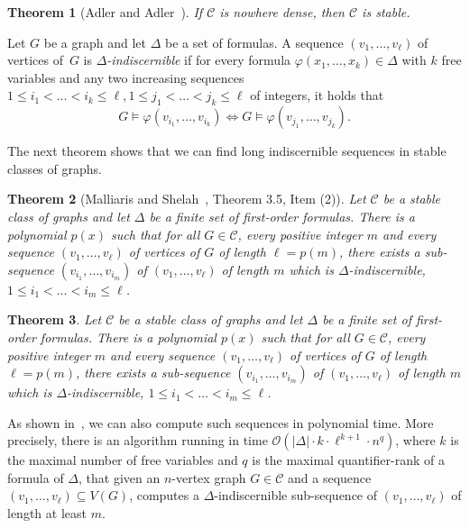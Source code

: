 \documentclass[11pt, fleqn]{article}
\theoremstyle{plain}
\newtheorem{theorem}{Theorem}
\theoremstyle{nonumberplain}
\newcommand{\Oof}{\mathcal{O}}
\newcommand{\CCC}{\mathcal{C}}
\renewcommand{\phi}{\varphi}
\newcommand{\abs}[1]{\ensuremath{\left\lvert#1\right\rvert}}
\begin{document}
\begin{theorem}[Adler and Adler~\cite{adler2014interpreting}]\label{thm:adleradler}
If $\CCC$ is nowhere dense, then $\CCC$ is stable. 
\end{theorem}

Let $G$ be a graph and let $\Delta$ be a set of formulas. A sequence
$(v_1,\ldots, v_\ell)$ of vertices of~$G$ is
\emph{$\Delta$-indiscernible} if for every formula
$\phi(x_1,\ldots, x_k)\in \Delta$ with $k$ free variables and any two
increasing sequences
$1\leq i_1<\ldots <i_k\leq \ell, 1\leq j_1< \ldots< j_k\leq \ell$ of
integers, it holds that
\[G\models\phi(v_{i_1},\ldots, v_{i_k})\Leftrightarrow G\models\phi(v_{j_1},
\ldots, v_{j_k}).\]

The next theorem shows that we can find long indiscernible
sequences in stable classes of graphs. 

\begin{theorem}[Malliaris and Shelah~\cite{malliaris2014regularity}, Theorem 3.5, Item (2)]\label{thm:malshelah}
  Let $\CCC$ be a stable class of graphs and let $\Delta$ be a finite
  set of first-order formulas.  There is a polynomial $p(x)$ such that
  for all $G\in \CCC$, every positive integer $m$ and every sequence
  $(v_1,\ldots, v_\ell)$ of vertices of $G$ of length $\ell=p(m)$, there
  exists a sub-sequence $(v_{i_1},\ldots, v_{i_m})$ of
  $(v_1,\ldots, v_\ell)$ of length $m$ which is
  $\Delta$-indiscernible, $1\leq i_1<\ldots <i_m\leq \ell$.
\end{theorem}


\begin{theorem}\label{thm:extract_indiscernibles}
  Let $\CCC$ be a stable class of graphs and let $\Delta$ be a finite
  set of first-order formulas.  There is a polynomial $p(x)$ such that
  for all $G\in \CCC$, every positive integer $m$ and every sequence
  $(v_1,\ldots, v_\ell)$ of vertices of $G$ of length $\ell=p(m)$, there
  exists a sub-sequence $(v_{i_1},\ldots, v_{i_m})$ of
  $(v_1,\ldots, v_\ell)$ of length $m$ which is
  $\Delta$-indiscernible, $1\leq i_1<\ldots <i_m\leq \ell$.
\end{theorem}

As shown in~\cite{siebertz2016polynomial}, we can also compute
such sequences in polynomial time. More precisely, there is an algorithm running in time
  $\Oof(\abs{\Delta}\cdot k \cdot \ell^{k+1}
    \cdot n^{q})$, where $k$ is the maximal number of 
    free variables and $q$ is 
    the maximal quantifier-rank of a formula of $\Delta$, 
    that given an $n$-vertex graph $G\in \CCC$ and a sequence
  $(v_1,\ldots, v_\ell)\subseteq V(G)$, computes a
  $\Delta$-indiscernible sub-sequence of $(v_1,\ldots, v_\ell)$ 
  of length at least $m$.
\end{document}

